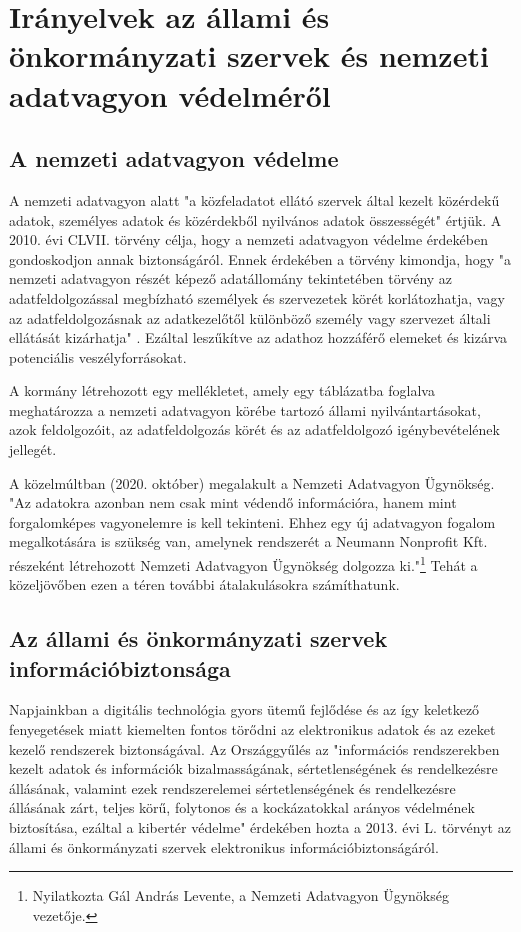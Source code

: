 \section{Irányelvek az állami és önkormányzati szervek és nemzeti adatvagyon védelméről}

\subsection*{A nemzeti adatvagyon védelme}

A nemzeti adatvagyon alatt "a közfeladatot ellátó szervek által kezelt közérdekű adatok, személyes adatok és közérdekből nyilvános adatok összességét" \cite{2010-CLVII-torveny} értjük. A 2010. évi CLVII. törvény célja, hogy a nemzeti adatvagyon védelme érdekében gondoskodjon annak biztonságáról. Ennek érdekében a törvény kimondja, hogy "a nemzeti adatvagyon részét képező adatállomány tekintetében törvény az adatfeldolgozással megbízható személyek és szervezetek körét korlátozhatja, vagy az adatfeldolgozásnak az adatkezelőtől különböző személy vagy szervezet általi ellátását kizárhatja" \cite{2010-CLVII-torveny}. Ezáltal leszűkítve az adathoz hozzáférő elemeket és kizárva potenciális veszélyforrásokat.

A kormány létrehozott egy mellékletet, amely egy táblázatba foglalva meghatározza a nemzeti adatvagyon körébe tartozó állami nyilvántartásokat, azok feldolgozóit, az adatfeldolgozás körét és az adatfeldolgozó igénybevételének jellegét. \cite{38/2011}

A közelmúltban (2020. október) megalakult a Nemzeti Adatvagyon Ügynökség. "Az adatokra azonban nem csak mint védendő információra, hanem mint forgalomképes vagyonelemre is kell tekinteni. Ehhez egy új adatvagyon fogalom megalkotására is szükség van, amelynek rendszerét a Neumann Nonprofit Kft. részeként létrehozott Nemzeti Adatvagyon Ügynökség dolgozza ki."\footnote{Nyilatkozta Gál András Levente, a Nemzeti Adatvagyon Ügynökség vezetője.} Tehát a közeljövőben ezen a téren további átalakulásokra számíthatunk.

\subsection*{Az állami és önkormányzati szervek információbiztonsága}

Napjainkban a digitális technológia gyors ütemű fejlődése és az így keletkező fenyegetések miatt kiemelten fontos törődni az elektronikus adatok és az ezeket kezelő rendszerek biztonságával. Az Országgyűlés az "információs rendszerekben kezelt adatok és információk bizalmasságának, sértetlenségének és rendelkezésre állásának, valamint ezek rendszerelemei sértetlenségének és rendelkezésre állásának zárt, teljes körű, folytonos és a kockázatokkal arányos védelmének biztosítása, ezáltal a kibertér védelme" \cite{2013-L-torveny} érdekében hozta a 2013. évi L. törvényt az állami és önkormányzati szervek elektronikus információbiztonságáról.

